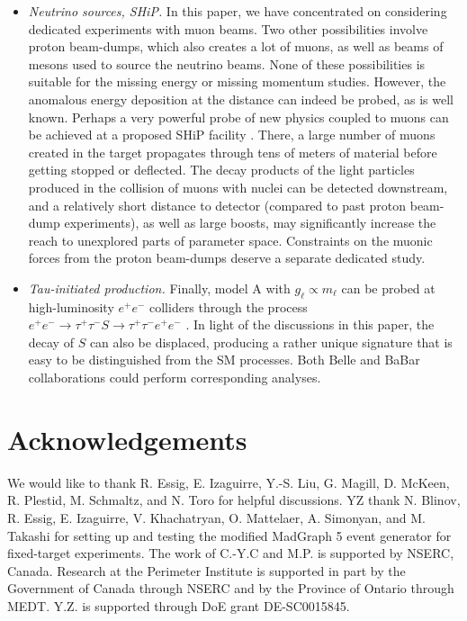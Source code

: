 \documentclass[prd,onecolumn,notitlepage,
nofootinbib,aps,tightenlines,
preprintnumbers,amsmath,amssymb,amsfonts,showpacs,superscriptaddress]{revtex4-1}
\begin{document}
\begin{itemize}
\item {\em Neutrino sources, SHiP.} 
In this paper, we have concentrated on considering dedicated experiments with muon beams.
Two other possibilities involve proton beam-dumps, which also creates a lot of muons, as well as 
beams of mesons used to source the neutrino beams. None of these possibilities is suitable for the 
missing energy or missing momentum studies. However, the anomalous energy deposition at the 
distance can indeed be probed, as is well known. Perhaps a very powerful probe of new physics coupled 
to muons can be achieved at a proposed SHiP facility \cite{Alekhin:2015byh}. There, a large number of muons created in the target 
propagates through tens of meters of material before getting stopped or deflected. The decay products of the 
light particles produced in the collision of muons with nuclei can be detected downstream, and a relatively 
short distance to detector (compared to past proton beam-dump experiments), as well as large boosts, 
may significantly increase the reach to unexplored parts of parameter space. Constraints on the muonic forces from the 
proton beam-dumps deserve a separate dedicated study. 
 

\item {\em  Tau-initiated production. } Finally, model A with $g_\ell \propto m_\ell$ can be probed at 
high-luminosity $e^+e^-$ colliders through the process $e^+e^-\to \tau^+\tau^- S\to \tau^+\tau^- e^+e^-$ \cite{Batell:2016ove}. In light of the 
discussions in this paper, the decay of $S$ can also be displaced, producing a rather unique signature that is easy to be distinguished from the 
SM processes. Both Belle and BaBar collaborations could perform corresponding analyses. 




\end{itemize}




\section*{Acknowledgements}

We would like to thank R. Essig,  E. Izaguirre, Y.-S. Liu, G. Magill, D. McKeen, R. Plestid, M. Schmaltz, and N. Toro for helpful discussions.  YZ thank N. Blinov, R. Essig, E. Izaguirre, V. Khachatryan, O. Mattelaer, A. Simonyan, and M. Takashi for setting up and testing the modified MadGraph 5 event generator for fixed-target experiments. The work of C.-Y.C and M.P. is supported by NSERC, Canada. 
Research at the Perimeter Institute is supported in part by the Government of Canada through NSERC and by the Province of Ontario through MEDT. Y.Z. is supported through DoE grant DE-SC0015845.
\end{document}
